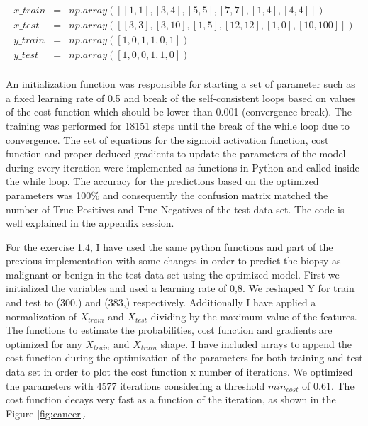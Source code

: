 \documentclass{article}
\begin{document}
\begin{eqnarray}
x\_train &=& np.array([[1,1],[3,4],[5,5],[7,7],[1,4],[4,4]])  \\
x\_test &=& np.array([[3,3],[3,10],[1,5],[12,12],[1,0],[10,100]]) \\
y\_train &=& np.array([1,0,1,1,0,1]) \\
y\_test &=& np.array([1,0,0,1,1,0]) \\
\end{eqnarray}

An initialization function was responsible for starting a set of parameter such as a fixed learning rate of 0.5 and break of the self-consistent loops based on values of the cost function which should be lower than 0.001 (convergence break). The training was performed for 18151 steps until the break of the while loop due to convergence. The set of equations for the sigmoid activation function, cost function and proper deduced gradients to update the parameters of the model during every iteration were implemented as functions in Python and called inside the while loop. The accuracy for the predictions based on the optimized parameters was 100$\%$ and consequently the confusion matrix matched the number of True Positives and True Negatives of the test data set. The code is well explained in the appendix session.

	For the exercise 1.4, I have used the same python functions and part of the previous implementation with some changes in order to predict the biopsy as malignant or benign in the test data set using the optimized model. First we initialized the variables and used a learning rate of 0,8. We reshaped  Y for train and test to (300,) and (383,) respectively. Additionally I have applied a normalization of $X_{train}$ and $X_{test}$ dividing by the maximum value of the features. The functions to estimate the probabilities, cost function and gradients are optimized for any $X_{train}$ and $X_{train}$ shape. I have included arrays to append the cost function during the optimization of the parameters for both training and test data set in order to plot the cost function x number of iterations. We optimized the parameters with 4577 iterations considering a threshold $min_{cost}$ of 0.61. The cost function decays very fast as a function of the iteration, as shown in the Figure \ref{fig:cancer}.
\end{document}
